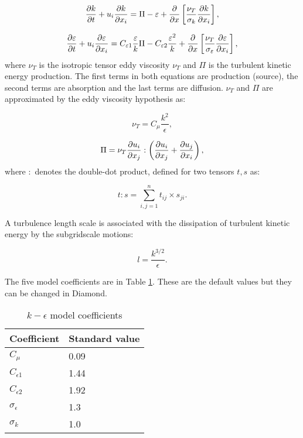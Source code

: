 \begin{equation}\label{k}
\ppt[t]{k} + u_i \ppx[x_i]{k} = \Pi - \epsilon + \ppx{} \left [ \frac{\nu_T}{\sigma_k} \ppx[x_i]{k} \right ],
\end{equation}

\begin{equation}\label{eps}
\ppt[t]{\epsilon} + u_i \ppx[x_i]{\epsilon} = C_{\epsilon1} \frac {\epsilon}{k} \Pi - C_{\epsilon2} \frac{\epsilon^2}{k} + \ppx{} \left [ \frac{\nu_T}{\sigma_\epsilon} \ppx[x_i]{\epsilon} \right ],
\end{equation}
where $\nu_T$ is the isotropic tensor eddy viscosity $\nu_T$ and $\Pi$ is the turbulent kinetic energy production. The first terms in both equations are production (source), the second terms are absorption and the last terms are diffusion. $\nu_T$ and $\Pi$ are approximated by the eddy viscosity hypothesis as:

\begin{equation}\label{nut}
\nu_T = C_\mu \frac{k^2}{\epsilon},
\end{equation}

\begin{equation}\label{Pi2}
\Pi = \nu_T \ppx[x_j]{u_i} : \left ( \ppx[x_j]{u_i} + \ppx[x_i]{u_j} \right ),
\end{equation}
where $:$ denotes the double-dot product, defined for two tensors $t, s$ as:

\begin{equation}\label{doubledot}
t:s = \sum_{i,j=1}^{n} t_{ij} \times s_{ji}.
\end{equation}

A turbulence length scale is associated with the dissipation of turbulent kinetic energy by the subgridscale motions:

\begin{equation}\label{lengthscale}
l = \frac{k^{3/2}}{\epsilon}.
\end{equation}

The five model coefficients are in Table \ref{tab:kepsco}. These are the default values but they can be changed in Diamond.

\begin{table}[hb]
\begin{center}
\begin{tabular}{ll}\hline
Coefficient & Standard value \\ \hline
$C_\mu$ & 0.09 \\
$C_{\epsilon1}$ & 1.44 \\
$C_{\epsilon2}$ & 1.92 \\
$\sigma_\epsilon$ & 1.3 \\
$\sigma_k$ & 1.0 \\ \hline
\end{tabular}
\end{center}
\caption{$k-\epsilon$ model coefficients}
\label{tab:kepsco}
\end{table}

